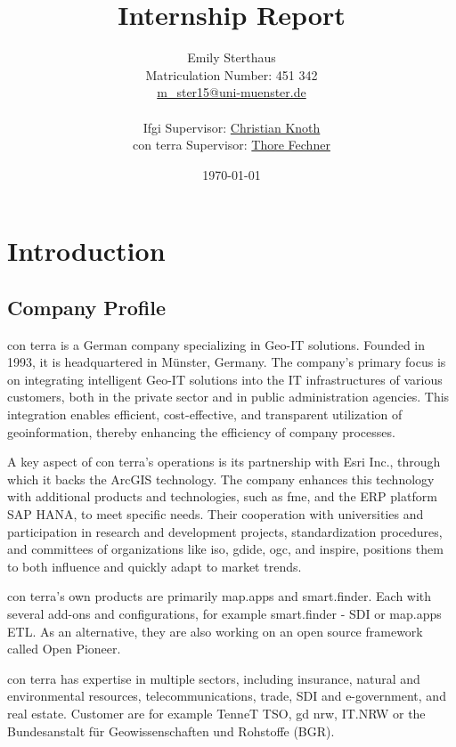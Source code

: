 \documentclass[11pt, titlepage, a4paper]{article}
\title{Internship Report}
\author{Emily Sterthaus \\ Matriculation Number: 451 342 \\ \href{mailto:m_ster15@uni-muenster.de}{m\_ster15@uni-muenster.de}\\ \\
\small Ifgi Supervisor: \href{mailto:christian.knoth@uni-muenster.de}{Christian Knoth}\\ \small con terra Supervisor: \href{mailto:t.fechner@conterra.de}{Thore Fechner}
}
\date{\today}
\begin{document}
\maketitle
\newpage
\tableofcontents
\newpage

\section{Introduction}

\subsection{Company Profile}

con terra is a German company specializing in Geo-IT solutions. Founded in 1993, it is headquartered in Münster, Germany. The company's primary focus is on integrating intelligent Geo-IT solutions into the IT infrastructures of various customers, both in the private sector and in public administration agencies. This integration enables efficient, cost-effective, and transparent utilization of geoinformation, thereby enhancing the efficiency of company processes.

A key aspect of con terra's operations is its partnership with Esri Inc., through which it backs the ArcGIS technology. The company enhances this technology with additional products and technologies, such as \gls{fme}, and the ERP platform SAP HANA, to meet specific needs. Their cooperation with universities and participation in research and development projects, standardization procedures, and committees of organizations like \gls{iso}, \gls{gdide}, \gls{ogc}, and \gls{inspire}, positions them to both influence and quickly adapt to market trends.

con terra's own products are primarily map.apps and smart.finder. Each with several add-ons and configurations, for example smart.finder - SDI or map.apps ETL. As an alternative, they are also working on an open source framework called Open Pioneer.

con terra has expertise in multiple sectors, including insurance, natural and environmental resources, telecommunications, trade, SDI and e-government, and real estate. Customer are for example TenneT TSO,  \gls {gd} \gls{nrw}, IT.NRW or the Bundesanstalt für Geowissenschaften und Rohstoffe  (BGR).
\end{document}

